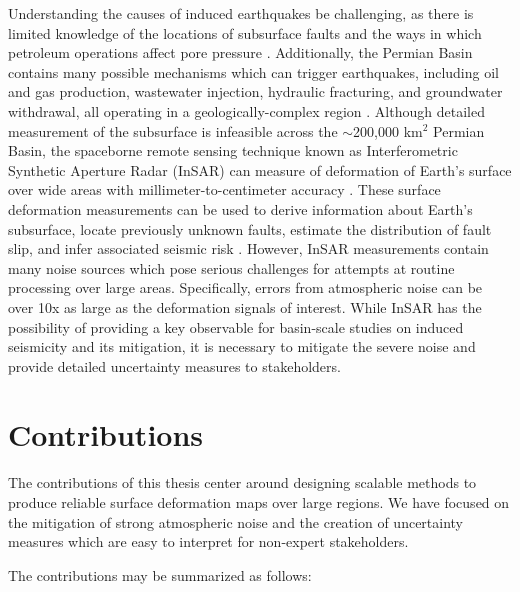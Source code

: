 Understanding the causes of induced earthquakes be challenging, as there is limited knowledge of the locations of subsurface faults and the ways in which petroleum operations affect pore pressure \citep{Hennings2021StabilityFaultSystems}. Additionally, the Permian Basin contains many possible mechanisms which can trigger earthquakes, including oil and gas production, wastewater injection, hydraulic fracturing, and groundwater withdrawal, all operating in a geologically-complex region \citep{Smye2021VariationsVerticalStress}.
Although detailed measurement of the subsurface is infeasible across the $\sim$200,000 km$^2$ Permian Basin, the spaceborne remote sensing technique known as Interferometric Synthetic Aperture Radar (InSAR) can measure of deformation of Earth's surface over wide areas with millimeter-to-centimeter accuracy \citep{Massonnet1993DisplacementFieldLanders, Buergmann2000SyntheticApertureRadar}. These surface deformation measurements can be used to derive information about Earth's subsurface, locate previously unknown faults, estimate the distribution of fault slip, and infer associated seismic risk \citep{Segall2010EarthquakeVolcanoDeformation, Elliott2016RoleSpaceBased, Huang2017FaultGeometryInversion}.
However, InSAR measurements contain many noise sources which pose serious challenges for attempts at routine processing over large areas. Specifically, errors from atmospheric noise can be over 10x as large as the deformation signals of interest.
While InSAR has the possibility of providing a key observable for basin-scale studies on induced seismicity and its mitigation, it is necessary to mitigate the severe noise and provide detailed uncertainty measures to stakeholders.





\section{Contributions}
\label{sec:chap1-contributions}


The contributions of this thesis center around designing scalable methods to produce reliable surface deformation maps over large regions. We have focused on the mitigation of strong atmospheric noise and the creation of uncertainty measures which are easy to interpret for non-expert stakeholders.


The contributions may be summarized as follows:

